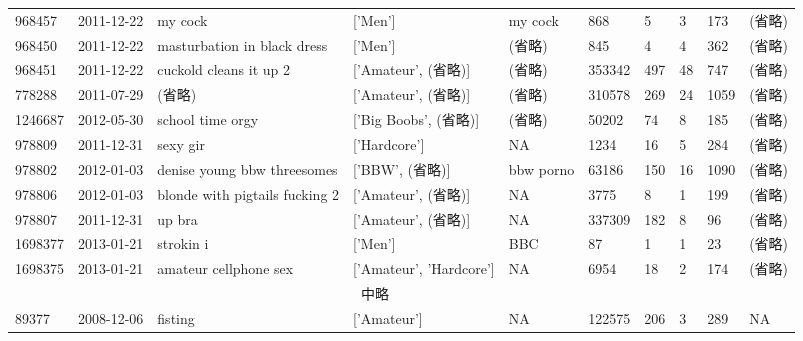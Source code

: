 \documentclass[uplatex]{jsarticle}
\begin{document}
\begin{landscape}
\begin{table}[htb]
\begin{center}
\begin{tabular}{llllllllll}
    968457 & 2011-12-22 & my cock & ['Men'] & my cock & 868 & 5 & 3 & 173 & (省略) \\
    968450 & 2011-12-22 & masturbation in black dress & ['Men'] & (省略) & 845 & 4 & 4 & 362 & (省略) \\
    968451 & 2011-12-22 & cuckold cleans it up 2 & ['Amateur', (省略)] & (省略) & 353342 & 497 & 48 & 747 & (省略) \\
    778288 & 2011-07-29 & (省略) & ['Amateur', (省略)] & (省略) & 310578 & 269 & 24 & 1059 & (省略) \\
    1246687 & 2012-05-30 & school time orgy & ['Big Boobs', (省略)] & (省略) & 50202 & 74 & 8 & 185 & (省略) \\
    978809 & 2011-12-31 & sexy gir & ['Hardcore'] & NA & 1234 & 16 & 5 & 284 & (省略) \\
    978802 & 2012-01-03 & denise young bbw threesomes & ['BBW', (省略)] & bbw porno & 63186 & 150 & 16 & 1090 & (省略) \\
    978806 & 2012-01-03 & blonde with pigtails fucking 2 & ['Amateur', (省略)] & NA & 3775 & 8 & 1 & 199 & (省略) \\
    978807 & 2011-12-31 & up bra & ['Amateur', (省略)] & NA & 337309 & 182 & 8 & 96 & (省略) \\
    1698377 & 2013-01-21 & strokin i & ['Men'] & BBC  & 87 & 1 & 1 & 23 & (省略) \\
    1698375 & 2013-01-21 & amateur cellphone sex & ['Amateur', 'Hardcore'] & NA & 6954 & 18 & 2 & 174 & (省略) \\

    \multicolumn{9}{c}{中略} \\
    89377 & 2008-12-06 & fisting & ['Amateur'] & NA & 122575 & 206 & 3 & 289 & NA \\
    \hline
    \end{tabular}
\label{tab:dataset}
\end{center}
\end{table}
\end{landscape}
\end{document}
